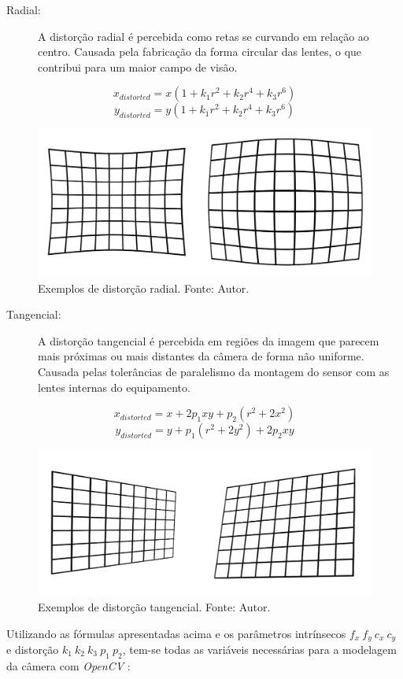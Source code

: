\begin{description}
    \item[Radial:] A distorção radial é percebida como retas se curvando em relação ao centro. Causada pela fabricação da forma circular das lentes, o que contribui para um maior campo de visão.
\end{description}
\[ x_{distorted} = x(1+k_1 r^2 + k_2 r^4 + k_3 r^6) \]
\[ y_{distorted} = y(1+k_1 r^2 + k_2 r^4 + k_3 r^6) \]
\begin{figure}[H]
    \centering
    \includegraphics[width=.65\linewidth]{figuras/radial-dist.png}
    \caption{Exemplos de distorção radial. Fonte: Autor.}
    \label{fig:radial_dist}
\end{figure}
\begin{description}
    \item[Tangencial:] A distorção tangencial é percebida em regiões da imagem que parecem mais próximas ou mais distantes da câmera de forma não uniforme. Causada pelas tolerâncias de paralelismo da montagem do sensor com as lentes internas do equipamento.
\end{description}
\[ x_{distorted} = x + 2 p_1 x y + p_2 (r^2 + 2x^2)\]
\[ y_{distorted} = y + p_1(r^2+2y^2)+2p_2xy\]
\begin{figure}[H] 
    \centering
    \includegraphics[width=.65\linewidth]{figuras/tan-dist.png}
    \caption{Exemplos de distorção tangencial. Fonte: Autor.}
    \label{fig:tan_dist}
\end{figure}

Utilizando as fórmulas apresentadas acima e os parâmetros intrínsecos \(f_x \ f_y \ c_x \ c_y\) e distorção \(k_1 \ k_2 \ k_3 \ p_1 \ p_2\), tem-se todas as variáveis necessárias para a modelagem da câmera com \textit{OpenCV} \cite{Calibration}:

